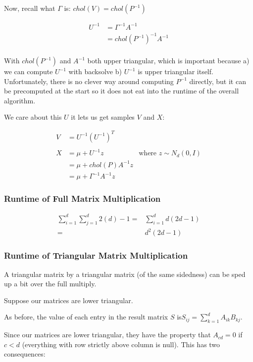 \documentclass[english]{article}
\begin{document}
Now, recall what $\Gamma$ is: $chol(V)=chol(P^{-1})$

\begin{align*}
U^{-1} & =\Gamma^{-1}A^{-1}\\
 & =chol(P^{-1})^{-1}A^{-1}\\
\end{align*}


With $chol(P^{-1})$ and $A^{-1}$ both upper triangular, which is important because a) we can compute $U^{-1}$ with backsolve b) $U^{-1}$ is upper triangular itself. Unfortunately, there is no clever way around computing $P^{-1}$ directly, but it can be precomputed at the start so it does not eat into the runtime of the overall algorithm.

We care about this $U$ it lets us get samples $V$ and $X$:

\begin{align*}
V & =U^{-1}\left(U^{-1}\right)^{T}\\
\\
X & =\mu+U^{-1}z & \text{where }z\sim N_{d}(0,I)\\
 & =\mu+chol(P)A^{-1}z\\
 & =\mu+\Gamma^{-1}A^{-1}z
\end{align*}


\subsubsection*{Runtime of Full Matrix Multiplication}

\begin{align*}
\sum_{i=1}^{d}\sum_{j=1}^{d}2(d)-1= & \sum_{i=1}^{d}d(2d-1)\\
= & d^{2}(2d-1)
\end{align*}



\subsubsection*{Runtime of Triangular Matrix Multiplication}

A triangular matrix by a triangular matrix (of the same sidedness)
can be sped up a bit over the full multiply.

Suppose our matrices are lower triangular.

As before, the value of each entry in the result matrix $S$ is$S_{ij}=\sum_{k=1}^{d}A_{ik}B_{kj}$.

Since our matrices are lower triangular, they have the property that
$A_{cd}=0$ if $c<d$ (everything with row strictly above column is
null). This has two consequences:
\end{document}
